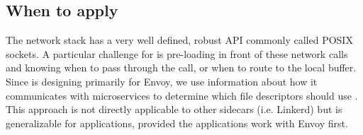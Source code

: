 \subsection{When to apply \sysname}
The network stack has a very well defined, robust API commonly called POSIX sockets.
A particular challenge for \sysname is pre-loading in front of these network calls and knowing when
to pass through the call, or when to route to the local buffer.
Since \sysname is designing primarily for Envoy, we use information about how it communicates with microservices to determine
which file descriptors should use \sysname.
This approach is not directly applicable to other sidecars (i.e. Linkerd) but is generalizable for applications, provided the applications work with Envoy first.

